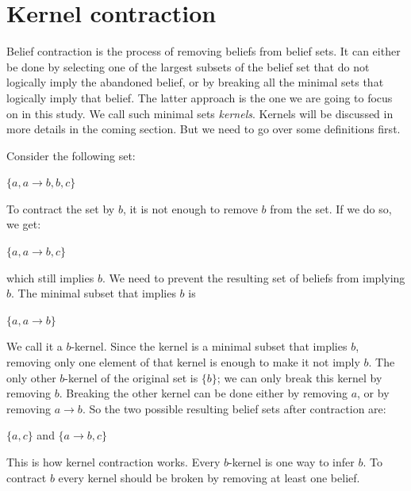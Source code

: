 \chapter{Kernel contraction}
Belief contraction is the process of removing beliefs from belief sets. It can either be done by selecting one  of the largest subsets of the belief set that do not logically imply the abandoned belief, or by breaking all the minimal sets that logically imply that belief. The latter approach is the one we are going to focus on in this study. We call such minimal sets \textit{kernels}. Kernels will be discussed in more details in the coming section. But we need to go over some definitions first.

Consider the following set:
\begin{center}
$ \lbrace a, a \rightarrow b, b, c \rbrace $
\end{center}
To contract the set by $b$, it is not enough to remove $b$ from the set. If we do so, we get:
\begin{center}
$ \lbrace a, a \rightarrow b, c \rbrace $
\end{center}
which still implies $b$. We need to prevent the resulting set of beliefs from implying $b$. The minimal subset that implies $b$ is 
\begin{center}
$ \lbrace a, a \rightarrow b \rbrace $
\end{center}
We call it a $b$-kernel. Since the kernel is a minimal subset that implies $b$, removing only one element of that kernel is enough to make it not imply $b$. The only other $b$-kernel of the original set is $\lbrace b \rbrace$; we can only break this kernel by removing $b$. Breaking the other kernel can be done either by removing $a$, or by removing $a \rightarrow b$. So the two possible resulting belief sets after contraction are:
\begin{center}
$ \lbrace a, c \rbrace $ and $ \lbrace a \rightarrow b, c \rbrace $
\end{center}
This is how kernel contraction works. Every $b$-kernel is one way to infer $b$. To contract $b$ every kernel should be broken by removing at least one belief. 


